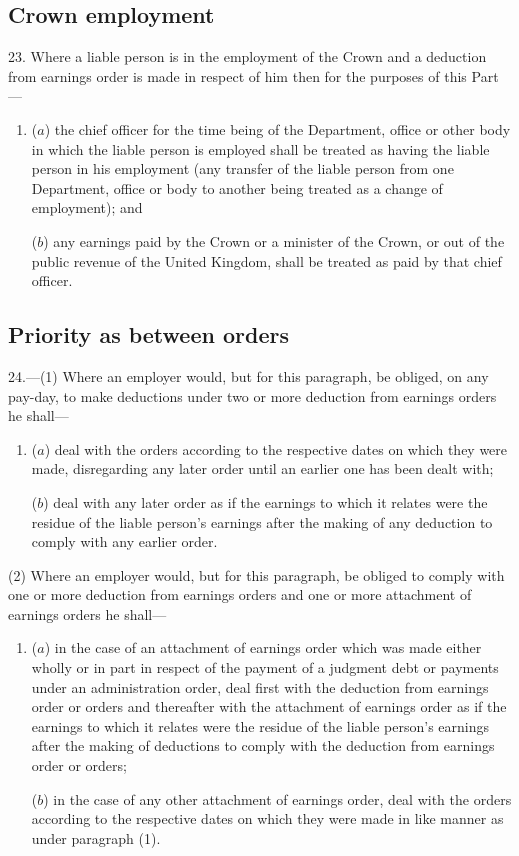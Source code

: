 \documentclass[a4paper]{article}
\begin{document}
\subsection[23. Crown employment]{Crown employment}

23.  Where a liable person is in the employment of the Crown and a deduction from earnings order is made in respect of him then for the purposes of this Part—
\begin{enumerate}\item[]
($a$) the chief officer for the time being of the Department, office or other body in which the liable person is employed shall be treated as having the liable person in his employment (any transfer of the liable person from one Department, office or body to another being treated as a change of employment); and

($b$) any earnings paid by the Crown or a minister of the Crown, or out of the public revenue of the United Kingdom, shall be treated as paid by that chief officer.
\end{enumerate}

\subsection[24. Priority as between orders]{Priority as between orders}

24.—(1) Where an employer would, but for this paragraph, be obliged, on any pay-day, to make deductions under two or more deduction from earnings orders he shall—
\begin{enumerate}\item[]
($a$) deal with the orders according to the respective dates on which they were made, disregarding any later order until an earlier one has been dealt with;

($b$) deal with any later order as if the earnings to which it relates were the residue of the liable person’s earnings after the making of any deduction to comply with any earlier order.
\end{enumerate}

(2) Where an employer would, but for this paragraph, be obliged to comply with one or more deduction from earnings orders and one or more attachment of earnings orders he shall—
\begin{enumerate}\item[]
($a$) in the case of an attachment of earnings order which was made either wholly or in part in respect of the payment of a judgment debt or payments under an administration order, deal first with the deduction from earnings order or orders and thereafter with the attachment of earnings order as if the earnings to which it relates were the residue of the liable person’s earnings after the making of deductions to comply with the deduction from earnings order or orders;

($b$) in the case of any other attachment of earnings order, deal with the orders according to the respective dates on which they were made in like manner as under paragraph (1).
\end{enumerate}
\end{document}
